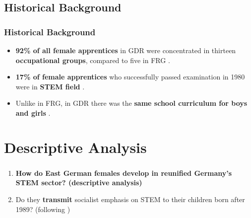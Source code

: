 \documentclass[11pt, aspectratio=1610, xcolor={dvipsnames}]{beamer}
\newcommand{\highlight}[1]{\textbf{\textcolor{PineGreen}{#1}}}
\begin{document}
	\subsection{Historical Background}
	\begin{frame}
		\frametitle{Historical Background}
		
		\begin{itemize}
			\item \highlight{92\% of all female apprentices} in GDR were concentrated in thirteen \highlight{occupational groups}, compared to five in FRG \textcolor{darkgray}{\citep{Menschik1974}}.
			\item \highlight{17\% of female apprentices} who successfully passed examination in 1980 were in \highlight{STEM field} \textcolor{darkgray}{\citep[p. 293]{DDRJahrbuch1981}}.
			\item Unlike in FRG, in GDR there was the \highlight{same school curriculum for boys and girls} \textcolor{darkgray}{\citep{FuchsSchuendeln2016, Lippmann2018}}.
		\end{itemize}
		
	\end{frame}
	
	\section{Descriptive Analysis}
	\begin{frame}
		\frametitle{}
		
		\begin{enumerate}
			\item \textbf{How do East German females develop in \highlight{reunified Germany's STEM sector}? (descriptive analysis)}
			\item Do they \highlight{transmit} socialist emphasis on STEM to their children born after 1989? (following \cite{Fernandez2011})
		\end{enumerate}
		
	\end{frame}
			
\end{document}
